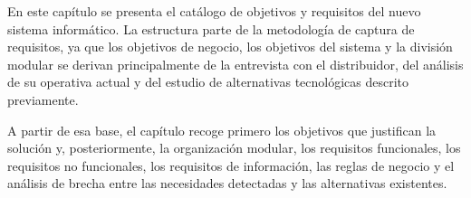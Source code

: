 En este capítulo se presenta el catálogo de objetivos y requisitos del nuevo sistema informático. La estructura parte de la metodología de captura de requisitos, ya que los objetivos de negocio, los objetivos del sistema y la división modular se derivan principalmente de la entrevista con el distribuidor, del análisis de su operativa actual y del estudio de alternativas tecnológicas descrito previamente.

A partir de esa base, el capítulo recoge primero los objetivos que justifican la solución y, posteriormente, la organización modular, los requisitos funcionales, los requisitos no funcionales, los requisitos de información, las reglas de negocio y el análisis de brecha entre las necesidades detectadas y las alternativas existentes.











